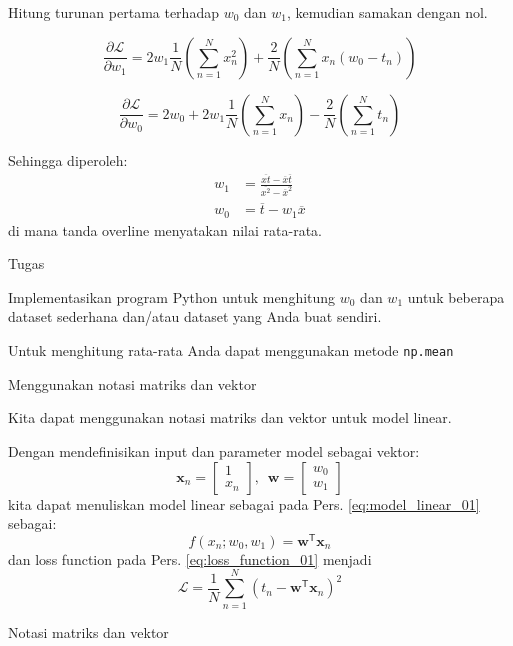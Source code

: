 \documentclass[a4paper,12pt]{article} %
\newcommand{\pyinline}[1]{\texttt{#1}}
\begin{document}
Hitung turunan pertama terhadap $w_0$ dan $w_1$, kemudian samakan dengan nol.

$$
\frac{\partial\mathcal{L}}{\partial w_1} = 2w_1 \frac{1}{N} \left( \sum_{n=1}^{N} x_n^2 \right) +
\frac{2}{N} \left( \sum_{n=1}^{N} x_{n} (w_0 - t_n) \right)
$$

$$
\frac{\partial \mathcal{L}}{\partial w_0} = 2w_0 + 2w_1 \frac{1}{N} \left( \sum_{n=1}^{N} x_n \right) -
\frac{2}{N} \left( \sum_{n=1}^{N} t_n \right)
$$

Sehingga diperoleh:
\begin{align}
w_{1} & = \frac{\overline{xt} - \overline{x}\overline{t}}{\overline{x^2} - \overline{x}^2} \\
w_{0} & = \overline{t} - w_{1} \overline{x}
\end{align}
di mana tanda overline menyatakan nilai rata-rata.


Tugas

Implementasikan program Python untuk menghitung $w_{0}$ dan $w_{1}$ untuk beberapa
dataset sederhana dan/atau dataset yang Anda buat sendiri.

Untuk menghitung rata-rata Anda dapat menggunakan metode \pyinline{np.mean}

Menggunakan notasi matriks dan vektor

Kita dapat menggunakan notasi matriks dan vektor untuk model linear.

Dengan mendefinisikan input dan parameter model sebagai vektor:
$$
\mathbf{x}_{n} = \begin{bmatrix}
1 \\
x_{n}
\end{bmatrix}
,\,\,\,%
\mathbf{w} = \begin{bmatrix}
w_{0} \\
w_{1}
\end{bmatrix}
$$
kita dapat menuliskan model linear sebagai pada Pers. \eqref{eq:model_linear_01}
sebagai:
\begin{equation}
f(x_n; w_0, w_1) = \mathbf{w}^{\mathsf{T}} \mathbf{x}_{n}
\label{eq:model_linear_02}
\end{equation}
%
dan loss function pada Pers. \eqref{eq:loss_function_01} menjadi
\begin{equation}
\mathcal{L} = \frac{1}{N} \sum_{n=1}^{N} \left( t_{n} - \mathbf{w}^{\mathsf{T}}
\mathbf{x}_{n} \right)^2
\label{eq:loss_function_02}
\end{equation}


Notasi matriks dan vektor
\end{document}
